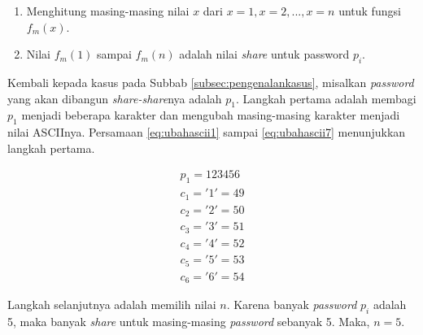 \begin{enumerate}
	\item Menghitung masing-masing nilai \begin{math}x\end{math} dari \begin{math}x=1, x=2, ..., x=n\end{math} untuk fungsi \begin{math}f_m(x)\end{math}.
	\item Nilai \begin{math}f_m(1)\end{math} sampai \begin{math}f_m(n)\end{math} adalah nilai \textit{share} untuk password \begin{math}p_i\end{math}.
\end{enumerate}

Kembali kepada kasus pada Subbab \ref{subsec:pengenalankasus}, misalkan \textit{password} yang akan dibangun \textit{share-share}nya adalah \begin{math}p_1\end{math}. Langkah pertama adalah membagi \begin{math}p_1\end{math} menjadi beberapa karakter dan mengubah masing-masing karakter menjadi nilai ASCIInya. Persamaan \ref{eq:ubahascii1} sampai \ref{eq:ubahascii7} menunjukkan langkah pertama.

\begin{gather}
	p_1 = 123456 \label{eq:ubahascii1} \\
	c_1 = '1' = 49 \label{eq:ubahascii2} \\
	c_2 = '2' = 50 \label{eq:ubahascii3} \\
	c_3 = '3' = 51 \label{eq:ubahascii4} \\
	c_4 = '4' = 52 \label{eq:ubahascii5} \\
	c_5 = '5' = 53 \label{eq:ubahascii6} \\
	c_6 = '6' = 54 \label{eq:ubahascii7}
\end{gather}

Langkah selanjutnya adalah memilih nilai \begin{math}n\end{math}. Karena banyak \textit{password} \begin{math}p_i\end{math} adalah 5, maka banyak \textit{share} untuk masing-masing \textit{password} sebanyak 5. Maka, \begin{math}n=5\end{math}.

